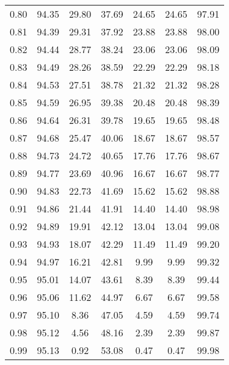 \begin{tabular}{|c|c|c|c|c|c|c|}
      0.80 &     94.35 &     29.80 &      37.69 &   24.65 &      24.65 &         97.91 \\
      0.81 &     94.39 &     29.31 &      37.92 &   23.88 &      23.88 &         98.00 \\
      0.82 &     94.44 &     28.77 &      38.24 &   23.06 &      23.06 &         98.09 \\
      0.83 &     94.49 &     28.26 &      38.59 &   22.29 &      22.29 &         98.18 \\
      0.84 &     94.53 &     27.51 &      38.78 &   21.32 &      21.32 &         98.28 \\
      0.85 &     94.59 &     26.95 &      39.38 &   20.48 &      20.48 &         98.39 \\
      0.86 &     94.64 &     26.31 &      39.78 &   19.65 &      19.65 &         98.48 \\
      0.87 &     94.68 &     25.47 &      40.06 &   18.67 &      18.67 &         98.57 \\
      0.88 &     94.73 &     24.72 &      40.65 &   17.76 &      17.76 &         98.67 \\
      0.89 &     94.77 &     23.69 &      40.96 &   16.67 &      16.67 &         98.77 \\
      0.90 &     94.83 &     22.73 &      41.69 &   15.62 &      15.62 &         98.88 \\
      0.91 &     94.86 &     21.44 &      41.91 &   14.40 &      14.40 &         98.98 \\
      0.92 &     94.89 &     19.91 &      42.12 &   13.04 &      13.04 &         99.08 \\
      0.93 &     94.93 &     18.07 &      42.29 &   11.49 &      11.49 &         99.20 \\
      0.94 &     94.97 &     16.21 &      42.81 &    9.99 &       9.99 &         99.32 \\
      0.95 &     95.01 &     14.07 &      43.61 &    8.39 &       8.39 &         99.44 \\
      0.96 &     95.06 &     11.62 &      44.97 &    6.67 &       6.67 &         99.58 \\
      0.97 &     95.10 &      8.36 &      47.05 &    4.59 &       4.59 &         99.74 \\
      0.98 &     95.12 &      4.56 &      48.16 &    2.39 &       2.39 &         99.87 \\
      0.99 &     95.13 &      0.92 &      53.08 &    0.47 &       0.47 &         99.98 \\
\bottomrule
\end{tabular}
